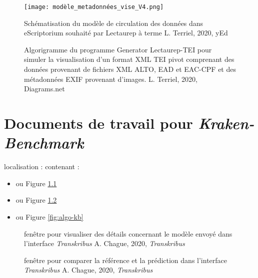 \begin{figure}
  \begin{sideways}
    \texttt{[image: modèle\_metadonnées\_vise\_V4.png]}
  \end{sideways}
  \centering
  \caption{Schématisation du modèle de circulation des données dans eScriptorium souhaité par Lectaurep à terme  \textcopyright L. Terriel, 2020, yEd}
  \label{fig:modele_vise_V4}
\end{figure}

\begin{figure}
    \centering
    \centerline{}
    \caption{Algorigramme du programme Generator Lectaurep-TEI pour simuler la visualisation d'un format XML TEI pivot comprenant des données provenant de fichiers XML ALTO, EAD et EAC-CPF et des métadonnées EXIF provenant d'images.   \textcopyright L. Terriel, 2020, Diagrams.net}
    \label{fig:generateur_tei}
\end{figure}

\chapter{Documents de travail pour \textit{\textit{Kraken-Benchmark}}}\label{doc_ax_kb}
localisation :  contenant :

\begin{itemize}
    \item {} ou Figure \ref{fig:details-model-transkribus}
    \item {} ou Figure \ref{fig:compare-texts-transkribus}
    \item {} ou Figure \ref{fig:algo-kb}
\end{itemize}

\begin{figure}
    \centering
    \centerline{}
    \caption{fenêtre pour visualiser des détails concernant le modèle envoyé dans l'interface \textit{Transkribus} \textcopyright A. Chague, 2020, \textit{Transkribus}}
    \label{fig:details-model-transkribus}
\end{figure}

\begin{figure}
    \centering
    \centerline{}
    \caption{fenêtre pour comparer la référence et la prédiction dans l'interface \textit{Transkribus} \textcopyright A. Chague, 2020, \textit{Transkribus}}
    \label{fig:compare-texts-transkribus}
\end{figure}

